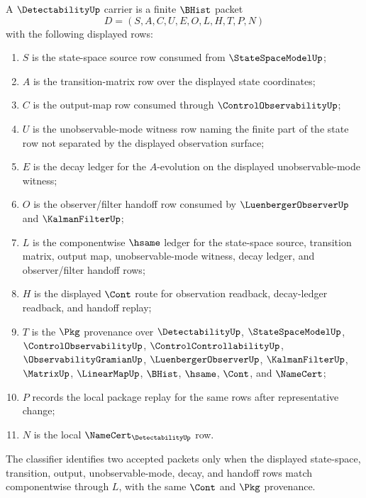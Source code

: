 \begin{definition}
\label{def:detectability-carrier}
A $\DetectabilityUp$ carrier is a finite $\BHist$ packet
$$
D=(S,A,C,U,E,O,L,H,T,P,N)
$$
with the following displayed rows:
\begin{enumerate}
\item $S$ is the state-space source row consumed from $\StateSpaceModelUp$;
\item $A$ is the transition-matrix row over the displayed state coordinates;
\item $C$ is the output-map row consumed through $\ControlObservabilityUp$;
\item $U$ is the unobservable-mode witness row naming the finite part of the state row not separated by the displayed observation surface;
\item $E$ is the decay ledger for the $A$-evolution on the displayed unobservable-mode witness;
\item $O$ is the observer/filter handoff row consumed by $\LuenbergerObserverUp$ and $\KalmanFilterUp$;
\item $L$ is the componentwise $\hsame$ ledger for the state-space source, transition matrix, output map, unobservable-mode witness, decay ledger, and observer/filter handoff rows;
\item $H$ is the displayed $\Cont$ route for observation readback, decay-ledger readback, and handoff replay;
\item $T$ is the $\Pkg$ provenance over $\DetectabilityUp$, $\StateSpaceModelUp$, $\ControlObservabilityUp$, $\ControlControllabilityUp$, $\ObservabilityGramianUp$, $\LuenbergerObserverUp$, $\KalmanFilterUp$, $\MatrixUp$, $\LinearMapUp$, $\BHist$, $\hsame$, $\Cont$, and $\NameCert$;
\item $P$ records the local package replay for the same rows after representative change;
\item $N$ is the local $\NameCert_{\DetectabilityUp}$ row.
\end{enumerate}
The classifier identifies two accepted packets only when the displayed state-space, transition, output, unobservable-mode, decay, and handoff rows match componentwise through $L$, with the same $\Cont$ and $\Pkg$ provenance.
\end{definition}

